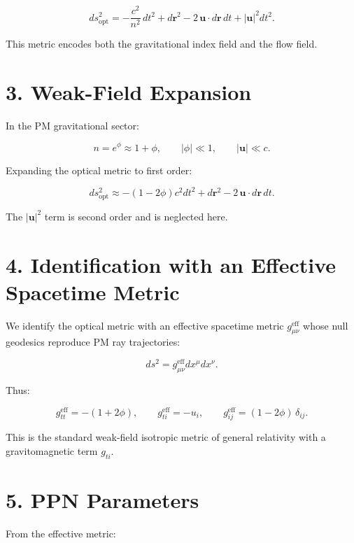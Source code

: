 \documentclass{article}
\begin{document}
\[
ds_{\mathrm{opt}}^2
=
-\frac{c^2}{n^2}\,dt^2
+
d\mathbf r^2
- 2\,\mathbf u\cdot d\mathbf r\,dt
+
|\mathbf u|^2 dt^2.
\]



This metric encodes both the gravitational index field and the flow field.

\section*{3. Weak-Field Expansion}

In the PM gravitational sector:



\[
n = e^\phi \approx 1 + \phi,
\qquad
|\phi| \ll 1,
\qquad
|\mathbf u| \ll c.
\]



Expanding the optical metric to first order:



\[
ds_{\mathrm{opt}}^2
\approx
-(1 - 2\phi)c^2 dt^2
+
d\mathbf r^2
- 2\,\mathbf u\cdot d\mathbf r\,dt.
\]



The $|\mathbf u|^2$ term is second order and is neglected here.

\section*{4. Identification with an Effective Spacetime Metric}

We identify the optical metric with an effective spacetime metric
$g_{\mu\nu}^{\mathrm{eff}}$ whose null geodesics reproduce PM ray trajectories:



\[
ds^2 = g_{\mu\nu}^{\mathrm{eff}} dx^\mu dx^\nu.
\]



Thus:



\[
g_{tt}^{\mathrm{eff}} = -(1 + 2\phi),
\qquad
g_{ti}^{\mathrm{eff}} = -u_i,
\qquad
g_{ij}^{\mathrm{eff}} = (1 - 2\phi)\,\delta_{ij}.
\]



This is the standard weak-field isotropic metric of general relativity with a
gravitomagnetic term $g_{ti}$.

\section*{5. PPN Parameters}

From the effective metric:
\end{document}
